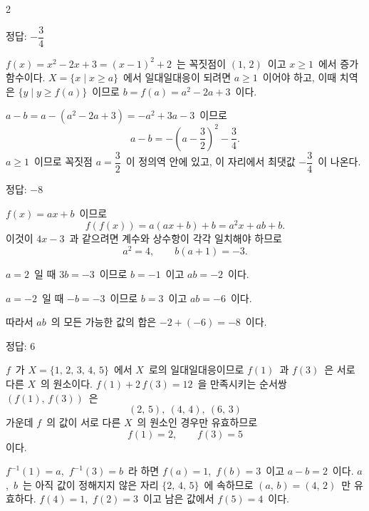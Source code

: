 \documentclass[10pt,fleqn]{article}
\begin{document}
\begin{multicols*}{2}
\begin{dmanswerbox}
정답: $-\dfrac{3}{4}$
\end{dmanswerbox}

$f(x) = x^{2} - 2x + 3 = (x - 1)^{2} + 2$\ 는 꼭짓점이 $(1,\, 2)$\ 이고 $x \ge 1$\ 에서 증가함수이다. $X = \{x \mid x \ge a\}$\ 에서 일대일대응이 되려면 $a \ge 1$\ 이어야 하고, 이때 치역은 $\{y \mid y \ge f(a)\}$\ 이므로 $b = f(a) = a^{2} - 2a + 3$\ 이다.

$a - b = a - (a^{2} - 2a + 3) = -a^{2} + 3a - 3$\ 이므로
\[ a - b = -\left(a - \dfrac{3}{2}\right)^{2} - \dfrac{3}{4}. \]
$a \ge 1$\ 이므로 꼭짓점 $a = \dfrac{3}{2}$\ 이 정의역 안에 있고, 이 자리에서 최댓값 $-\dfrac{3}{4}$\ 이 나온다.

\begin{dmanswerbox}
정답: $-8$
\end{dmanswerbox}

$f(x) = ax + b$\ 이므로
\[ f(f(x)) = a(ax + b) + b = a^{2} x + ab + b. \]
이것이 $4x - 3$\ 과 같으려면 계수와 상수항이 각각 일치해야 하므로
\[ a^{2} = 4,\qquad b(a + 1) = -3. \]

\vspace{3mm}
$a = 2$\ 일 때 $3b = -3$\ 이므로 $b = -1$\ 이고 $ab = -2$\ 이다.

\vspace{3mm}
$a = -2$\ 일 때 $-b = -3$\ 이므로 $b = 3$\ 이고 $ab = -6$\ 이다.

\vspace{3mm}
따라서 $ab$\ 의 모든 가능한 값의 합은 $-2 + (-6) = -8$\ 이다.
\begin{dmanswerbox}
정답: $6$
\end{dmanswerbox}

$f$\ 가 $X = \{1,\, 2,\, 3,\, 4,\, 5\}$\ 에서 $X$\ 로의 일대일대응이므로 $f(1)$\ 과 $f(3)$\ 은 서로 다른 $X$\ 의 원소이다. $f(1) + 2\,f(3) = 12$\ 을 만족시키는 순서쌍 $(f(1),\, f(3))$\ 은
\[ (2,\, 5),\ (4,\, 4),\ (6,\, 3) \]
가운데 $f$\ 의 값이 서로 다른 $X$\ 의 원소인 경우만 유효하므로
\[ f(1) = 2,\qquad f(3) = 5 \]
이다.

$f^{-1}(1) = a$,\ $f^{-1}(3) = b$\ 라 하면 $f(a) = 1$,\ $f(b) = 3$\ 이고 $a - b = 2$\ 이다. $a$,\ $b$\ 는 아직 값이 정해지지 않은 자리 $\{2,\, 4,\, 5\}$\ 에 속하므로 $(a,\, b) = (4,\, 2)$\ 만 유효하다. $f(4) = 1$,\ $f(2) = 3$\ 이고 남은 값에서 $f(5) = 4$\ 이다.


\end{multicols*}
\end{document}

